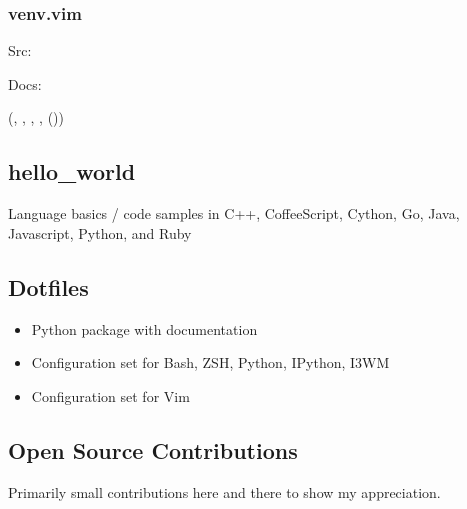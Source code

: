 \documentclass[letter,,openany,oneside,english]{sphinxhowto}
\begin{document}
\subsubsection{venv.vim}
\label{\detokenize{resume:venv-vim}}
\begin{DUlineblock}{0em}
\item[] Src: 
\item[] Docs: 
\end{DUlineblock}

(, , , , ())


\subsection{hello\_world}
\label{\detokenize{resume:hello-world}}
\begin{DUlineblock}{0em}
\item[] 
\end{DUlineblock}

Language basics / code samples in C++, CoffeeScript, Cython,
Go, Java, Javascript, Python, and Ruby


\subsection{Dotfiles}
\label{\detokenize{resume:dotfiles}}
\begin{DUlineblock}{0em}
\item[] 
\item[] 
\item[] 
\end{DUlineblock}
\begin{itemize}
\item {} 
Python package with documentation

\item {} 
Configuration set for Bash, ZSH, Python, IPython, I3WM

\item {} 
Configuration set for Vim

\end{itemize}


\subsection{Open Source Contributions}
\label{\detokenize{resume:open-source-contributions}}
Primarily small contributions here and there to show my appreciation.
\end{document}

